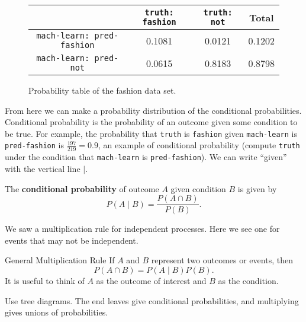 \begin{figure}[H]
    \centering
    \begin{tabular}{cccc} 
        \hline
        & \texttt{truth: fashion}  &\texttt{truth: not} & Total \\ \hline
        \texttt{mach-learn: pred-fashion}  & 0.1081 & 0.0121 & 0.1202 \\
        \texttt{mach-learn: pred-not} & 0.0615 & 0.8183 & 0.8798 \\ \hline 
    \end{tabular} 
\caption{Probability table of the fashion data set.} 
\end{figure}
From here we can make a probability distribution of the conditional probabilities. Conditional probability is the probability of an outcome given some condition to be true. For example, the probability that \texttt{truth} is \texttt{fashion}  given \texttt{mach-learn} is \texttt{pred-fashion} is $\frac{197}{219}=0.9$, an example of conditional probability (compute \texttt{truth} under the condition that \texttt{mach-learn}  is \texttt{pred-fashion}). We can write ``given'' with the vertical line $\mid $.
\begin{definition}[]
    The \textbf{conditional probability} of outcome $A$ given condition $B$ is given by \[
        P(A \mid B)= \frac{P(A \cap B)}{P(B)}.
    \] 
\end{definition}
We saw a multiplication rule for independent processes. Here we see one for events that may not be independent.
\begin{namedthing}{General Multiplication Rule} 
   If $A$ and $B$ represent two outcomes or events, then \[
       P(A \cap B) = P(A\mid B)P(B).
   \]  It is useful to think of $A$ as the outcome of interest and $B$ as the condition.
\end{namedthing}
Use tree diagrams. The end leaves give conditional probabilities, and multiplying gives unions of probabilities. 

